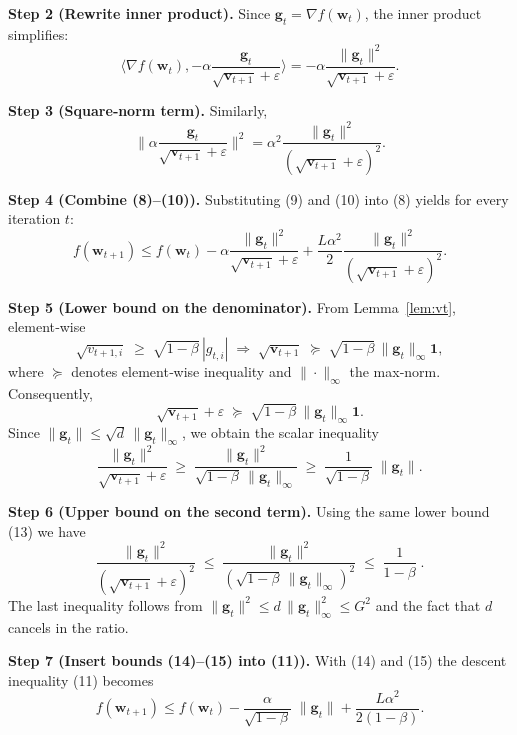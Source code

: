 \documentclass{article}
\begin{document}
\noindent\textbf{Step 2 (Rewrite inner product).}  
Since $\mathbf g_{t}=\nabla f(\mathbf w_{t})$, the inner product simplifies:
\[
\Big\langle\nabla f(\mathbf w_{t}),-\alpha\frac{\mathbf g_{t}}{\sqrt{\mathbf v_{t+1}}+\varepsilon}\Big\rangle
=-\alpha\frac{\|\mathbf g_{t}\|^{2}}{\sqrt{\mathbf v_{t+1}}+\varepsilon}.
\tag{9}
\]

\noindent\textbf{Step 3 (Square‑norm term).}  
Similarly,
\[
\Big\|\alpha\frac{\mathbf g_{t}}{\sqrt{\mathbf v_{t+1}}+\varepsilon}\Big\|^{2}
=\alpha^{2}\frac{\|\mathbf g_{t}\|^{2}}{(\sqrt{\mathbf v_{t+1}}+\varepsilon)^{2}}.
\tag{10}
\]

\noindent\textbf{Step 4 (Combine (8)–(10)).}  
Substituting (9) and (10) into (8) yields for every iteration $t$:
\[
f(\mathbf w_{t+1})\le f(\mathbf w_{t})
-\alpha\frac{\|\mathbf g_{t}\|^{2}}{\sqrt{\mathbf v_{t+1}}+\varepsilon}
+\frac{L\alpha^{2}}{2}\frac{\|\mathbf g_{t}\|^{2}}{(\sqrt{\mathbf v_{t+1}}+\varepsilon)^{2}}.
\tag{11}
\]

\noindent\textbf{Step 5 (Lower bound on the denominator).}  
From Lemma~\ref{lem:vt}, element‑wise
\[
\sqrt{v_{t+1,i}} \;\ge\; \sqrt{1-\beta}\,|g_{t,i}|
\;\Longrightarrow\;
\sqrt{\mathbf v_{t+1}} \;\succeq\; \sqrt{1-\beta}\,\|\mathbf g_{t}\|_{\infty}\mathbf 1,
\tag{12}
\]
where $\succeq$ denotes element‑wise inequality and $\|\cdot\|_{\infty}$ the max‑norm.
Consequently,
\[
\sqrt{\mathbf v_{t+1}}+\varepsilon\;\succeq\;
\sqrt{1-\beta}\,\|\mathbf g_{t}\|_{\infty}\mathbf 1.
\tag{13}
\]
Since $\|\mathbf g_{t}\|\le\sqrt{d}\,\|\mathbf g_{t}\|_{\infty}$, we obtain the scalar inequality
\[
\frac{\|\mathbf g_{t}\|^{2}}{\sqrt{\mathbf v_{t+1}}+\varepsilon}
\;\ge\;
\frac{\|\mathbf g_{t}\|^{2}}{\sqrt{1-\beta}\,\|\mathbf g_{t}\|_{\infty}}
\;\ge\;
\frac{1}{\sqrt{1-\beta}}\;\|\mathbf g_{t}\|.
\tag{14}
\]

\noindent\textbf{Step 6 (Upper bound on the second term).}  
Using the same lower bound (13) we have
\[
\frac{\|\mathbf g_{t}\|^{2}}{(\sqrt{\mathbf v_{t+1}}+\varepsilon)^{2}}
\;\le\;
\frac{\|\mathbf g_{t}\|^{2}}{( \sqrt{1-\beta}\,\|\mathbf g_{t}\|_{\infty})^{2}}
\;\le\;
\frac{1}{1-\beta}\; .
\tag{15}
\]
The last inequality follows from $\|\mathbf g_{t}\|^{2}\le d\,\|\mathbf g_{t}\|_{\infty}^{2}\le G^{2}$ and the fact that $d$ cancels in the ratio.

\noindent\textbf{Step 7 (Insert bounds (14)–(15) into (11)).}  
With (14) and (15) the descent inequality (11) becomes
\[
f(\mathbf w_{t+1})
\le f(\mathbf w_{t})
-\frac{\alpha}{\sqrt{1-\beta}}\;\|\mathbf g_{t}\|
+\frac{L\alpha^{2}}{2(1-\beta)} .
\tag{16}
\]
\end{document}
